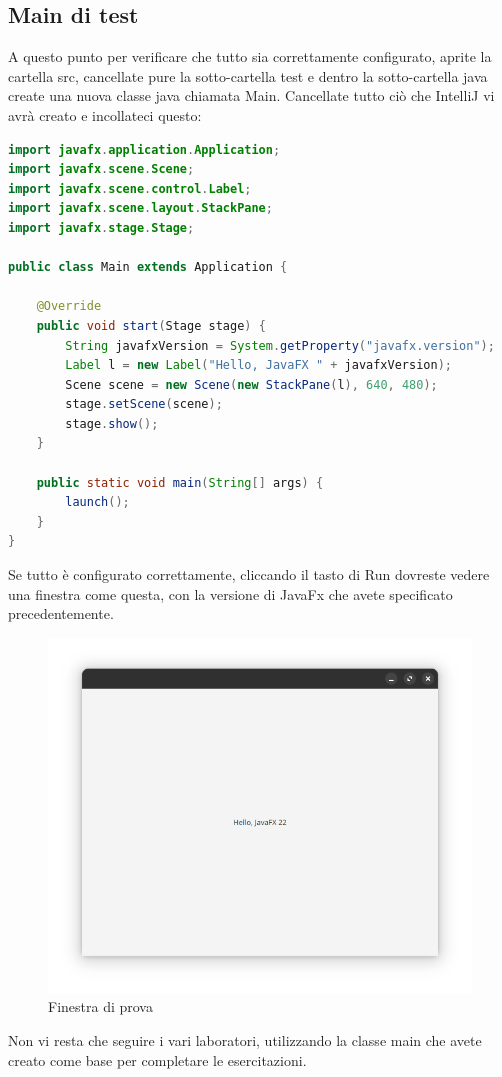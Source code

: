     \subsection{Main di test}
        A questo punto per verificare che tutto sia correttamente configurato, aprite la cartella src, cancellate pure la sotto-cartella test e dentro la 
        sotto-cartella java create una nuova classe java chiamata Main. Cancellate tutto ciò che IntelliJ vi avrà creato e incollateci questo:
        \begin{lstlisting}[language=Java]
import javafx.application.Application;
import javafx.scene.Scene;
import javafx.scene.control.Label;
import javafx.scene.layout.StackPane;
import javafx.stage.Stage;

public class Main extends Application {

    @Override
    public void start(Stage stage) {
        String javafxVersion = System.getProperty("javafx.version");
        Label l = new Label("Hello, JavaFX " + javafxVersion);
        Scene scene = new Scene(new StackPane(l), 640, 480);
        stage.setScene(scene);
        stage.show();
    }

    public static void main(String[] args) {
        launch();
    }
}            
        \end{lstlisting}
        Se tutto è configurato correttamente, cliccando il tasto di Run dovreste vedere una finestra come questa, con la versione di JavaFx che avete 
        specificato precedentemente.
        \begin{figure}[H]
            \centering
            \graphicspath{{src/capitoli/05/img/}}
            \includegraphics[width=\textwidth]{javafx_running.png}
            \caption{Finestra di prova}
            \label{fig:Finestra di prova}
        \end{figure}
        Non vi resta che seguire i vari laboratori, utilizzando la classe main che avete creato come base per completare le esercitazioni.